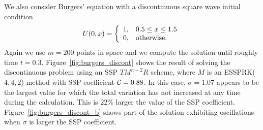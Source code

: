 We also consider Burgers' equation with a discontinuous
square wave initial condition
\begin{align*}%
    U(0,x)  = \left\{
                \begin{array}{ll}
                  1, & \hbox{$0.5 \leq x \leq 1.5$} \\
                  0, & \hbox{otherwise.}
                \end{array}
              \right.
\end{align*}
Again we use $m = 200$ points in space and we compute the solution until
roughly time $t = 0.3$.
Figure~\ref{fig:burgers_discont} shows the result of solving the
discontinuous problem using an SSP $TM^{n-2}R$ scheme, where $M$ is an
ESSPRK($4,4,2$) method with SSP coefficient $\mathcal{C} = 0.88$.
In this case, $\sigma = 1.07$ appears to be the largest value
for which the total variation has not increased at any time
during the calculation.
This is $22\%$ larger the value of the SSP coefficient.
Figure~\ref{fig:burgers_discont_b} shows part of the solution exhibiting 
oscillations when $\sigma$ is %
larger the SSP coefficient.



